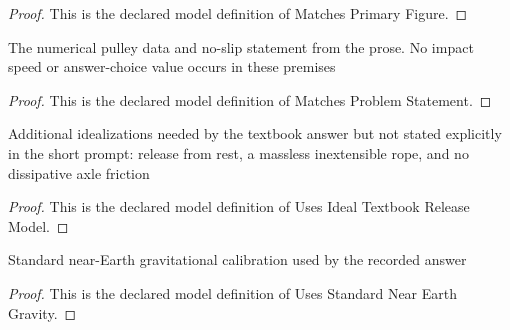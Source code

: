 \begin{proof}
  This is the declared model definition of Matches Primary Figure.
\end{proof}
\begin{definition}
  \label{def:physics:phyx-mini-0774:phyxminiproblems-problemphyxmini0774-matchesproblemstatement}
  The numerical pulley data and no-slip statement from the prose. No impact speed or answer-choice value occurs in these premises
\end{definition}
\begin{proof}
  This is the declared model definition of Matches Problem Statement.
\end{proof}
\begin{definition}
  \label{def:physics:phyx-mini-0774:phyxminiproblems-problemphyxmini0774-usesidealtextbookreleasemodel}
  Additional idealizations needed by the textbook answer but not stated explicitly in the short prompt: release from rest, a massless inextensible rope, and no dissipative axle friction
\end{definition}
\begin{proof}
  This is the declared model definition of Uses Ideal Textbook Release Model.
\end{proof}
\begin{definition}
  \label{def:physics:phyx-mini-0774:phyxminiproblems-problemphyxmini0774-usesstandardnearearthgravity}
  Standard near-Earth gravitational calibration used by the recorded answer
\end{definition}
\begin{proof}
  This is the declared model definition of Uses Standard Near Earth Gravity.
\end{proof}
